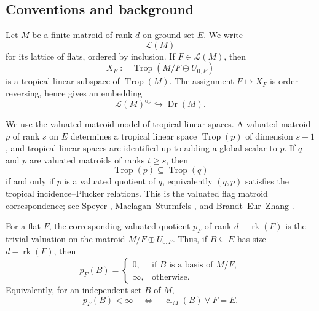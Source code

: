 \documentclass[12pt]{article}
\newcommand{\Trop}{\operatorname{Trop}}
\newcommand{\Dr}{\operatorname{Dr}}
\newcommand{\rk}{\operatorname{rk}}
\newcommand{\cl}{\operatorname{cl}}
\newcommand{\cL}{\mathcal L}
\theoremstyle{plain}
\theoremstyle{definition}
\begin{document}
%
\date{}


\begin{abstract}
We prove that if the lattice of flats of a finite matroid \(M\) admits an order-reversing involution \(F\mapsto F^\perp\), then the relative Dressian
\[
   \Dr(M)=\{\text{tropical linear subspaces of }\Trop(M)\}
\]
admits an order-reversing involution extending \(F\mapsto F^\perp\) under the natural embedding
\[
   \cL(M)^{\operatorname{op}}\hookrightarrow \Dr(M),\qquad
   F\longmapsto \Trop(M/F\oplus U_{0,F}).
\]
The main point is that an order-reversing involution of a geometric lattice forces the lattice to be modular.  For modular matroids, valuated quotients are naturally valuated matroids on the modular lattice of flats, and the desired involution is obtained by pulling back along the lattice polarity.
\end{abstract}

\subsection{Conventions and background}

Let \(M\) be a finite matroid of rank \(d\) on ground set \(E\).  We write
\[
  \cL(M)
\]
for its lattice of flats, ordered by inclusion.  If \(F\in \cL(M)\), then
\[
  X_F:=\Trop(M/F\oplus U_{0,F})
\]
is a tropical linear subspace of \(\Trop(M)\).  The assignment \(F\mapsto X_F\) is order-reversing, hence gives an embedding
\[
   \cL(M)^{\operatorname{op}}\hookrightarrow \Dr(M).
\]

We use the valuated-matroid model of tropical linear spaces.  A valuated matroid \(p\) of rank \(s\) on \(E\) determines a tropical linear space \(\Trop(p)\) of dimension \(s-1\), and tropical linear spaces are identified up to adding a global scalar to \(p\).  If \(q\) and \(p\) are valuated matroids of ranks \(t\ge s\), then
\[
   \Trop(p)\subseteq \Trop(q)
\]
if and only if \(p\) is a valuated quotient of \(q\), equivalently \((q,p)\) satisfies the tropical incidence--Plucker relations.  This is the valuated flag matroid correspondence; see Speyer \cite{SpeyerTLS}, Maclagan--Sturmfels \cite[Ch.~4]{MS}, and Brandt--Eur--Zhang \cite{BEZ}.

For a flat \(F\), the corresponding valuated quotient \(p_F\) of rank \(d-\rk(F)\) is the trivial valuation on the matroid \(M/F\oplus U_{0,F}\).  Thus, if \(B\subseteq E\) has size \(d-\rk(F)\), then
\[
   p_F(B)=
   \begin{cases}
   0, & \text{if } B \text{ is a basis of }M/F,\\
   \infty, & \text{otherwise}.
   \end{cases}
\]
Equivalently, for an independent set \(B\) of \(M\),
\[
   p_F(B)<\infty
   \quad\Longleftrightarrow\quad
   \cl_M(B)\vee F=E.
\]
\end{document}
